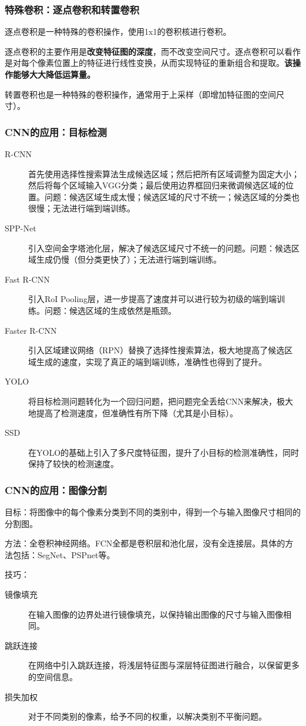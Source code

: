 \documentclass[aspectratio=1610]{ctexbeamer}
\begin{document}
\begin{frame}
    \frametitle{特殊卷积：逐点卷积和转置卷积}

    逐点卷积是一种特殊的卷积操作，使用1x1的卷积核进行卷积。
    
    逐点卷积的主要作用是\textbf{改变特征图的深度}，而不改变空间尺寸。逐点卷积可以看作是对每个像素位置上的特征进行线性变换，从而实现特征的重新组合和提取。\textbf{该操作能够大大降低运算量。}

    \vspace{1em}

    转置卷积也是一种特殊的卷积操作，通常用于上采样（即增加特征图的空间尺寸）。

\end{frame}

\begin{frame}
    \frametitle{CNN的应用：目标检测}

    \begin{description}
        \item[R-CNN] 首先使用选择性搜索算法生成候选区域；然后把所有区域调整为固定大小；然后将每个区域输入VGG分类；最后使用边界框回归来微调候选区域的位置。问题：候选区域生成太慢；候选区域的尺寸不统一；候选区域的分类也很慢；无法进行端到端训练。
        \item[SPP-Net] 引入空间金字塔池化层，解决了候选区域尺寸不统一的问题。问题：候选区域生成仍慢（但分类更快了）；无法进行端到端训练。
        \item[Fast R-CNN] 引入RoI Pooling层，进一步提高了速度并可以进行较为初级的端到端训练。问题：候选区域的生成依然是瓶颈。
        \item[Faster R-CNN] 引入区域建议网络（RPN）替换了选择性搜索算法，极大地提高了候选区域生成的速度，实现了真正的端到端训练，准确性也得到了提升。
        \item[YOLO] 将目标检测问题转化为一个回归问题，把问题完全丢给CNN来解决，极大地提高了检测速度，但准确性有所下降（尤其是小目标）。
        \item[SSD] 在YOLO的基础上引入了多尺度特征图，提升了小目标的检测准确性，同时保持了较快的检测速度。
    \end{description}

\end{frame}

\begin{frame}
    \frametitle{CNN的应用：图像分割}
    目标：将图像中的每个像素分类到不同的类别中，得到一个与输入图像尺寸相同的分割图。
    
    方法：全卷积神经网络。FCN全都是卷积层和池化层，没有全连接层。具体的方法包括：SegNet、PSPnet等。

    技巧：
    \begin{description}
        \item[镜像填充] 在输入图像的边界处进行镜像填充，以保持输出图像的尺寸与输入图像相同。
        \item[跳跃连接] 在网络中引入跳跃连接，将浅层特征图与深层特征图进行融合，以保留更多的空间信息。
        \item[损失加权] 对于不同类别的像素，给予不同的权重，以解决类别不平衡问题。 
    \end{description}
\end{frame}
\end{document}
